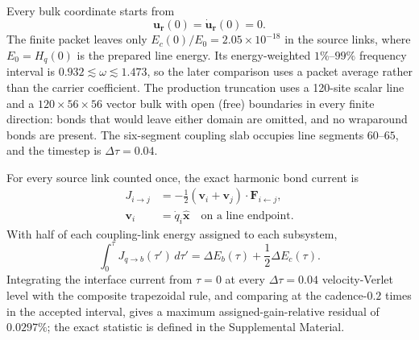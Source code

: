 \documentclass[10pt,aps,pre,reprint,floatfix,notitlepage,nofootinbib]{revtex4-2}
\begin{document}
Every bulk coordinate starts from
\begin{equation}
 \bm u_{\bm r}(0)=\dot{\bm u}_{\bm r}(0)=0.
 \label{eq:s7-unexcited-bulk}
\end{equation}
The finite packet leaves only $E_c(0)/E_0=2.05\times10^{-18}$ in the source links, where $E_0=H_q(0)$ is the prepared line energy.  Its energy-weighted $1\%$--$99\%$ frequency interval is $0.932\lesssim\omega\lesssim1.473$, so the later comparison uses a packet average rather than the carrier coefficient.  The production truncation uses a 120-site scalar line and a $120\times56\times56$ vector bulk with open (free) boundaries in every finite direction: bonds that would leave either domain are omitted, and no wraparound bonds are present. The six-segment coupling slab occupies line segments $60$--$65$, and the timestep is $\Delta\tau=0.04$.

For every source link counted once, the exact harmonic bond current is~\cite{Hardy1963}
\begin{align}
 J_{i\to j}
 &=-\tfrac12(\bm v_i+\bm v_j)
 \cdot\bm F_{i\leftarrow j},\\
 \bm v_i&=\dot q_i\hat{\bm x}
 \quad\text{on a line endpoint}.
 \label{eq:s7-current}
\end{align}
With half of each coupling-link energy assigned to each subsystem,
\begin{equation}
 \int_0^\tau J_{q\to b}(\tau')\,d\tau'
 =\Delta E_b(\tau)+\frac12\Delta E_c(\tau).
 \label{eq:s7-current-balance}
\end{equation}
Integrating the interface current from $\tau=0$ at every $\Delta\tau=0.04$ velocity-Verlet level with the composite trapezoidal rule, and comparing at the cadence-$0.2$ times in the accepted interval, gives a maximum assigned-gain-relative residual of $0.0297\%$; the exact statistic is defined in the Supplemental Material.
\end{document}
